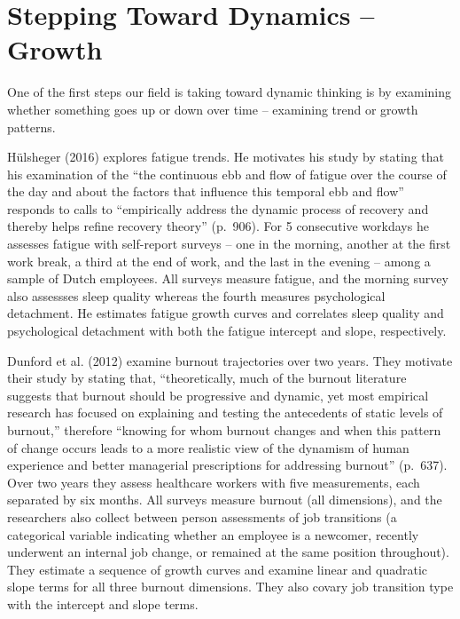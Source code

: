 \documentclass[english,,man]{apa6}
\theoremstyle{definition}
\theoremstyle{definition}
\theoremstyle{definition}
\theoremstyle{remark}
\begin{document}
\hypertarget{stepping-toward-dynamics-growth}{%
\section{Stepping Toward Dynamics --
Growth}\label{stepping-toward-dynamics-growth}}

One of the first steps our field is taking toward dynamic thinking is by
examining whether something goes up or down over time -- examining trend
or growth patterns.

Hülsheger (2016) explores fatigue trends. He motivates his study by
stating that his examination of the \enquote{the continuous ebb and flow
of fatigue over the course of the day and about the factors that
influence this temporal ebb and flow} responds to calls to
\enquote{empirically address the dynamic process of recovery and thereby
helps refine recovery theory} (p.~906). For 5 consecutive workdays he
assesses fatigue with self-report surveys -- one in the morning, another
at the first work break, a third at the end of work, and the last in the
evening -- among a sample of Dutch employees. All surveys measure
fatigue, and the morning survey also assessses sleep quality whereas the
fourth measures psychological detachment. He estimates fatigue growth
curves and correlates sleep quality and psychological detachment with
both the fatigue intercept and slope, respectively.

Dunford et al. (2012) examine burnout trajectories over two years. They
motivate their study by stating that, \enquote{theoretically, much of
the burnout literature suggests that burnout should be progressive and
dynamic, yet most empirical research has focused on explaining and
testing the antecedents of static levels of burnout,} therefore
\enquote{knowing for whom burnout changes and when this pattern of
change occurs leads to a more realistic view of the dynamism of human
experience and better managerial prescriptions for addressing burnout}
(p.~637). Over two years they assess healthcare workers with five
measurements, each separated by six months. All surveys measure burnout
(all dimensions), and the researchers also collect between person
assessments of job transitions (a categorical variable indicating
whether an employee is a newcomer, recently underwent an internal job
change, or remained at the same position throughout). They estimate a
sequence of growth curves and examine linear and quadratic slope terms
for all three burnout dimensions. They also covary job transition type
with the intercept and slope terms.
\end{document}

